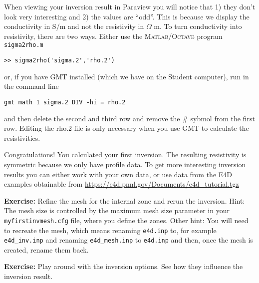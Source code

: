 \documentclass[11pt]{article}
\begin{document}
When viewing your inversion result in Paraview you will notice that 1)
they don't look very interesting and 2) the values are ``odd''. This
is because we display the conductivity in S/m and not the resistivity
in $\Omega$ m. To turn conductivity into resistivity, there are two
ways. Either use the \textsc{Matlab}/\textsc{Octave} program
\verb+sigma2rho.m+

\qquad \verb+>> sigma2rho('sigma.2','rho.2')+

or, if you have GMT installed (which we have on
the Student computer), run in the command line

\qquad \verb#gmt math 1 sigma.2 DIV -hi = rho.2#

and then delete the second and third row and remove the \# sybmol from
the first row. Editing the rho.2 file is only necessary when you use GMT to calculate
the resistivities.

Congratulations! You calculated your first inversion. The resulting
resistivity is symmetric because we only have profile data. To get
more interesting inversion results you can either work with your own
data, or use data from the E4D examples obtainable from \url{https://e4d.pnnl.gov/Documents/e4d_tutorial.tgz}

\textbf{Exercise:} Refine the mesh for the internal zone and rerun the
inversion. Hint: The mesh size is controlled by the maximum mesh size
parameter in your \verb+myfirstinvmesh.cfg+ file, where you define the
zones. Other hint: You will need to recreate the mesh, which means
renaming  \verb+e4d.inp+ to, for example \verb+e4d_inv.inp+ and
renaming \verb+e4d_mesh.inp+ to \verb+e4d.inp+ and then, once the mesh
is created, rename them back.

\textbf{Exercise:} Play around with the inversion options. See how
they influence the inversion result.
\end{document}

